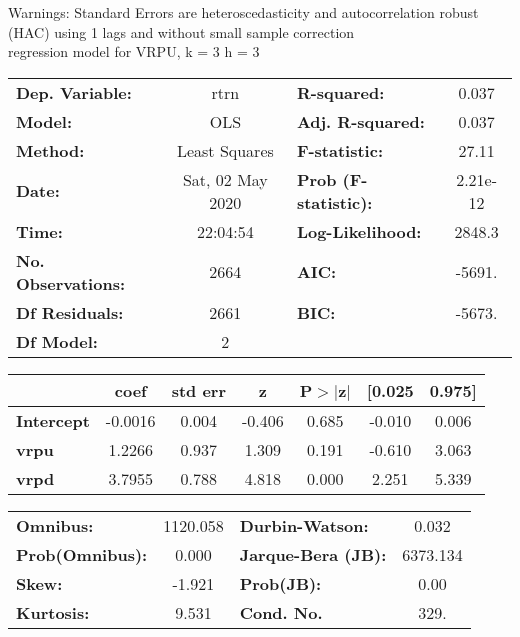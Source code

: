Warnings: \newline
 [1] Standard Errors are heteroscedasticity and autocorrelation robust (HAC) using 1 lags and without small sample correction\\ 

regression model for VRPU, k = 3 h = 3\begin{center}
\begin{tabular}{lclc}
\toprule
\textbf{Dep. Variable:}    &       rtrn       & \textbf{  R-squared:         } &     0.037   \\
\textbf{Model:}            &       OLS        & \textbf{  Adj. R-squared:    } &     0.037   \\
\textbf{Method:}           &  Least Squares   & \textbf{  F-statistic:       } &     27.11   \\
\textbf{Date:}             & Sat, 02 May 2020 & \textbf{  Prob (F-statistic):} &  2.21e-12   \\
\textbf{Time:}             &     22:04:54     & \textbf{  Log-Likelihood:    } &    2848.3   \\
\textbf{No. Observations:} &        2664      & \textbf{  AIC:               } &    -5691.   \\
\textbf{Df Residuals:}     &        2661      & \textbf{  BIC:               } &    -5673.   \\
\textbf{Df Model:}         &           2      & \textbf{                     } &             \\
\bottomrule
\end{tabular}
\begin{tabular}{lcccccc}
                   & \textbf{coef} & \textbf{std err} & \textbf{z} & \textbf{P$> |$z$|$} & \textbf{[0.025} & \textbf{0.975]}  \\
\midrule
\textbf{Intercept} &      -0.0016  &        0.004     &    -0.406  &         0.685        &       -0.010    &        0.006     \\
\textbf{vrpu}      &       1.2266  &        0.937     &     1.309  &         0.191        &       -0.610    &        3.063     \\
\textbf{vrpd}      &       3.7955  &        0.788     &     4.818  &         0.000        &        2.251    &        5.339     \\
\bottomrule
\end{tabular}
\begin{tabular}{lclc}
\textbf{Omnibus:}       & 1120.058 & \textbf{  Durbin-Watson:     } &    0.032  \\
\textbf{Prob(Omnibus):} &   0.000  & \textbf{  Jarque-Bera (JB):  } & 6373.134  \\
\textbf{Skew:}          &  -1.921  & \textbf{  Prob(JB):          } &     0.00  \\
\textbf{Kurtosis:}      &   9.531  & \textbf{  Cond. No.          } &     329.  \\
\bottomrule
\end{tabular}
\end{center}

